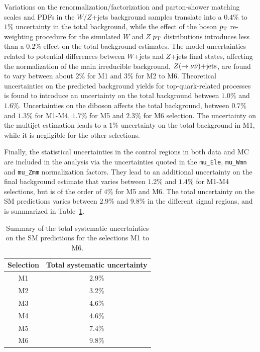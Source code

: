 Variations on the renormalization/factorization and parton-shower matching scales and PDFs in the \sherpa{} $W/Z$+jets background samples translate into a $0.4\%$ to $1\%$ uncertainty in the total background, while the effect of the boson $p_{\mathrm{T}}$ re-weighting procedure for the simulated $W$ and $Z$ $p_{\mathrm{T}}$ distributions introduces less than a $0.2\%$ effect on the total background estimates.
The model uncertainties related to potential differences between $W$+jets and $Z$+jets final states, affecting the normalization of the main irreducible background, $Z(\rightarrow \nu \bar{\nu})\text{+jets}$, are found to vary between about $2\%$ for M1 and $3\%$ for M2 to M6.
Theoretical uncertainties on the predicted background yields for top-quark-related processes is found to introduce an uncertainty on the total background between $1.0\%$ and $1.6\%$.
Uncertainties on the diboson affects the total background, between $0.7\%$ and $1.3\%$ for M1-M4, $1.7\%$ for M5 and $2.3\%$ for M6 selection.
The uncertainty on the multijet estimation leads to a $1\%$ uncertainty on the total background in M1, while it is negligible for the other selections.

Finally, the statistical uncertainties in the control regions in both data and MC are included in the analysis via the uncertainties quoted in the \texttt{mu\_Ele}, \texttt{mu\_Wmn} and \texttt{mu\_Zmm} normalization factors.
They lead to an additional uncertainty on the final background estimate that varies between $1.2\%$ and $1.4\%$ for M1-M4 selections, but is of the order of $4\%$ for M5 and M6.
The total uncertainty on the SM predictions varies between 2.9\% and 9.8\% in the different signal regions, and is summarized in Table~\ref{tab:SystematicSummary}.

\begin{table}[tb]
\begin{center}
\begin{small}
\begin{tabular}{cc}
\hline
\textbf{Selection} & \textbf{Total systematic uncertainty} \\ 
\hline
M1              & 2.9\% \\ 
M2              & 3.2\% \\ 
M3              & 4.6\% \\ 
M4              & 4.6\% \\ 
M5              & 7.4\% \\ 
M6              & 9.8\% \\ 
\hline
\end{tabular}
\end{small}
\end{center}
\renewcommand{\baselinestretch}{1}
\caption{Summary of the total systematic uncertainties on the SM predictions for the selections M1 to M6.}
\label{tab:SystematicSummary}
\end{table}

